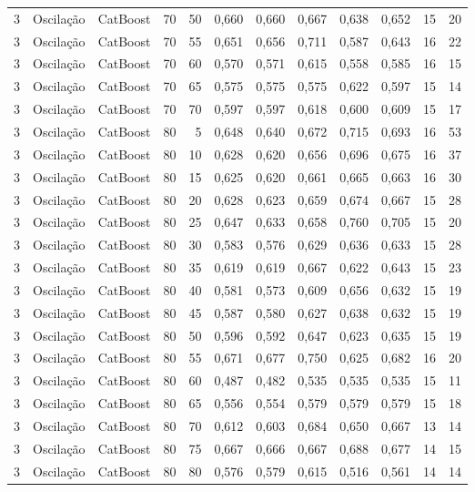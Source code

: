 \begin{longtable}{@{}rllrrrrrrrrr@{}}
3 & Oscilação & CatBoost & 70 & 50 & 0,660 & 0,660 & 0,667 & 0,638 & 0,652 & 15 & 20 \\
3 & Oscilação & CatBoost & 70 & 55 & 0,651 & 0,656 & 0,711 & 0,587 & 0,643 & 16 & 22 \\
3 & Oscilação & CatBoost & 70 & 60 & 0,570 & 0,571 & 0,615 & 0,558 & 0,585 & 16 & 15 \\
3 & Oscilação & CatBoost & 70 & 65 & 0,575 & 0,575 & 0,575 & 0,622 & 0,597 & 15 & 14 \\
3 & Oscilação & CatBoost & 70 & 70 & 0,597 & 0,597 & 0,618 & 0,600 & 0,609 & 15 & 17 \\
3 & Oscilação & CatBoost & 80 & 5 & 0,648 & 0,640 & 0,672 & 0,715 & 0,693 & 16 & 53 \\
3 & Oscilação & CatBoost & 80 & 10 & 0,628 & 0,620 & 0,656 & 0,696 & 0,675 & 16 & 37 \\
3 & Oscilação & CatBoost & 80 & 15 & 0,625 & 0,620 & 0,661 & 0,665 & 0,663 & 16 & 30 \\
3 & Oscilação & CatBoost & 80 & 20 & 0,628 & 0,623 & 0,659 & 0,674 & 0,667 & 15 & 28 \\
3 & Oscilação & CatBoost & 80 & 25 & 0,647 & 0,633 & 0,658 & 0,760 & 0,705 & 15 & 20 \\
3 & Oscilação & CatBoost & 80 & 30 & 0,583 & 0,576 & 0,629 & 0,636 & 0,633 & 15 & 28 \\
3 & Oscilação & CatBoost & 80 & 35 & 0,619 & 0,619 & 0,667 & 0,622 & 0,643 & 15 & 23 \\
3 & Oscilação & CatBoost & 80 & 40 & 0,581 & 0,573 & 0,609 & 0,656 & 0,632 & 15 & 19 \\
3 & Oscilação & CatBoost & 80 & 45 & 0,587 & 0,580 & 0,627 & 0,638 & 0,632 & 15 & 19 \\
3 & Oscilação & CatBoost & 80 & 50 & 0,596 & 0,592 & 0,647 & 0,623 & 0,635 & 15 & 19 \\
3 & Oscilação & CatBoost & 80 & 55 & 0,671 & 0,677 & 0,750 & 0,625 & 0,682 & 16 & 20 \\
3 & Oscilação & CatBoost & 80 & 60 & 0,487 & 0,482 & 0,535 & 0,535 & 0,535 & 15 & 11 \\
3 & Oscilação & CatBoost & 80 & 65 & 0,556 & 0,554 & 0,579 & 0,579 & 0,579 & 15 & 18 \\
3 & Oscilação & CatBoost & 80 & 70 & 0,612 & 0,603 & 0,684 & 0,650 & 0,667 & 13 & 14 \\
3 & Oscilação & CatBoost & 80 & 75 & 0,667 & 0,666 & 0,667 & 0,688 & 0,677 & 14 & 15 \\
3 & Oscilação & CatBoost & 80 & 80 & 0,576 & 0,579 & 0,615 & 0,516 & 0,561 & 14 & 14 \\

\end{longtable}
